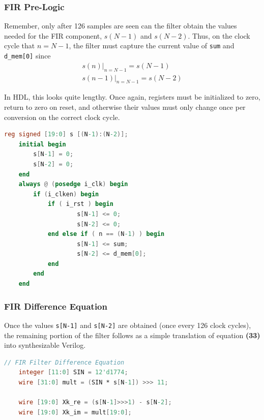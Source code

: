 \documentclass[reprint,amsmath,amssymb,aps,pra]{revtex4-2}
\begin{document}
\subsubsection{FIR Pre-Logic}

Remember, only after 126 samples are seen can the filter obtain the values needed for the FIR component, $s(N-1)$ and $s(N-2)$. Thus, on the clock cycle that $n = N-1$, the filter must capture the current value of \verb|sum| and \verb|d_mem[0]| since
\begin{align}
    \left. s(n) \right|_{n=N-1} = s(N-1) \nonumber \\
    \left. s(n-1) \right|_{n=N-1} = s(N-2)
\end{align}

In HDL, this looks quite lengthy. Once again, registers must be initialized to zero, return to zero on reset, and otherwise their values must only change once per conversion on the correct clock cycle.
\begin{minipage}{\linewidth}
    \begin{lstlisting}[language=Verilog]
    reg signed [19:0] s [(N-1):(N-2)];
    initial begin
        s[N-1] = 0;
        s[N-2] = 0;
    end
    always @ (posedge i_clk) begin
        if (i_clken) begin
            if ( i_rst ) begin
                    s[N-1] <= 0;
                    s[N-2] <= 0;
            end else if ( n == (N-1) ) begin
                    s[N-1] <= sum;
                    s[N-2] <= d_mem[0];
            end
        end
    end\end{lstlisting}
\end{minipage}

\subsubsection{FIR Difference Equation}

Once the values \verb|s[N-1]| and \verb|s[N-2]| are obtained (once every 126 clock cycles), the remaining portion of the filter follows as a simple translation of equation \textbf{(33)} into synthesizable Verilog. 
\begin{minipage}{\linewidth}
\begin{lstlisting}[language=Verilog]
    // FIR Filter Difference Equation
    integer [11:0] SIN = 12'd1774;
    wire [31:0] mult = (SIN * s[N-1]) >>> 11;

    wire [19:0] Xk_re = (s[N-1]>>>1) - s[N-2];
    wire [19:0] Xk_im = mult[19:0];  
\end{lstlisting}
\end{minipage}
\end{document}
